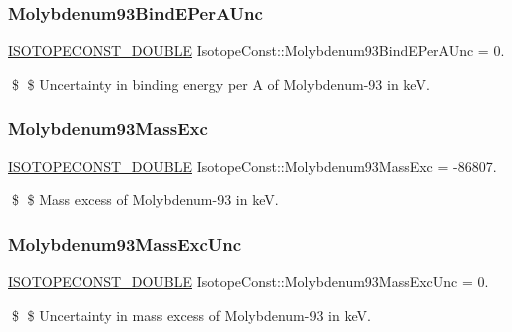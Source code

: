 \subsubsection{\texorpdfstring{Molybdenum93\+Bind\+E\+Per\+A\+Unc}{Molybdenum93BindEPerAUnc}}
{\footnotesize\ttfamily \mbox{\hyperlink{group___isotope_const-_macros_ga8f45a7272ce02c0b4c65c44636ed719a}{I\+S\+O\+T\+O\+P\+E\+C\+O\+N\+S\+T\+\_\+\+D\+O\+U\+B\+LE}} Isotope\+Const\+::\+Molybdenum93\+Bind\+E\+Per\+A\+Unc = 0.}

\$ \$ Uncertainty in binding energy per A of Molybdenum-\/93 in keV. \mbox{\label{group___isotope_const-_molybdenum-_mo93_gad2f8e5694f1ca3c35b7d752aa375ca4c}} 
\subsubsection{\texorpdfstring{Molybdenum93\+Mass\+Exc}{Molybdenum93MassExc}}
{\footnotesize\ttfamily \mbox{\hyperlink{group___isotope_const-_macros_ga8f45a7272ce02c0b4c65c44636ed719a}{I\+S\+O\+T\+O\+P\+E\+C\+O\+N\+S\+T\+\_\+\+D\+O\+U\+B\+LE}} Isotope\+Const\+::\+Molybdenum93\+Mass\+Exc = -\/86807.}

\$ \$ Mass excess of Molybdenum-\/93 in keV. \mbox{\label{group___isotope_const-_molybdenum-_mo93_ga03ef0ad65ba1d46037d40d9301748dd6}} 
\subsubsection{\texorpdfstring{Molybdenum93\+Mass\+Exc\+Unc}{Molybdenum93MassExcUnc}}
{\footnotesize\ttfamily \mbox{\hyperlink{group___isotope_const-_macros_ga8f45a7272ce02c0b4c65c44636ed719a}{I\+S\+O\+T\+O\+P\+E\+C\+O\+N\+S\+T\+\_\+\+D\+O\+U\+B\+LE}} Isotope\+Const\+::\+Molybdenum93\+Mass\+Exc\+Unc = 0.}

\$ \$ Uncertainty in mass excess of Molybdenum-\/93 in keV. \mbox{\label{group___isotope_const-_molybdenum-_mo93_ga9ec01d28e93231ce514bea8ef4f78f03}} 
